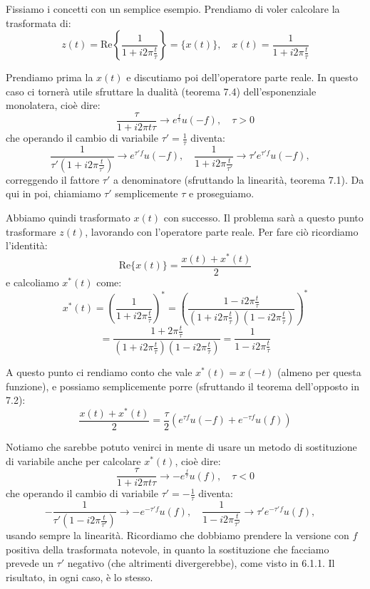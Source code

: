 \documentclass[a4paper,11pt]{article}
\begin{document}
\begin{enumerate}
\begin{enumerate}
Fissiamo i concetti con un semplice esempio. Prendiamo di voler calcolare la trasformata di:
$$
z(t) = \mathrm{Re} \left\{ \frac{1}{1 + i 2 \pi \frac{t}{\tau} } \right\} = \{ x(t) \}, \quad x(t) = \frac{1}{1 + i 2 \pi \frac{t}{\tau}}
$$

Prendiamo prima la $x(t)$ e discutiamo poi dell'operatore parte reale.
In questo caso ci tornerà utile sfruttare la dualità (teorema 7.4) dell'esponenziale monolatera, cioè dire:
$$
\frac{\tau}{1 + i 2 \pi t \tau} \rightarrow e^{\frac{f}{\tau}} u(-f)  , \quad \tau > 0
$$
che operando il cambio di variabile $\tau' = \frac{1}{\tau}$ diventa:
$$
\frac{1}{\tau' \left( 1 + i 2 \pi \frac{t}{\tau'} \right) } \rightarrow e^{\tau' f} u(-f), \quad
\frac{1}{ 1 + i 2 \pi \frac{t}{\tau'} } \rightarrow \tau' e^{\tau' f} u(-f), \quad
$$
correggendo il fattore $\tau'$ a denominatore (sfruttando la linearità, teorema 7.1). Da qui in poi, chiamiamo $\tau'$ semplicemente $\tau$ e proseguiamo.

Abbiamo quindi trasformato $x(t)$ con successo. Il problema sarà a questo punto trasformare $z(t)$, lavorando con l'operatore parte reale. Per fare ciò ricordiamo l'identità:
$$
\mathrm{Re} \{ x(t) \} = \frac{x(t) + x^*(t)}{2}
$$
e calcoliamo $x^*(t)$ come:
$$
x^*(t) = \left( \frac{1}{1 + i 2 \pi \frac{t}{\tau} }\right)^* = \left( \frac{1 - i 2 \pi \frac{t}{\tau} }{ \left( 1 + i 2 \pi \frac{t}{\tau} \right) \left( 1 - i 2 \pi \frac{t}{\tau} \right) } \right)^*
$$
$$
= \frac{1 + 2 \pi \frac{t}{\tau} }{ \left( 1 + i 2 \pi \frac{t}{\tau} \right) \left( 1 - i 2 \pi \frac{t}{\tau} \right) } = \frac{1}{ 1 - i 2 \pi \frac{t}{\tau} }
$$

A questo punto ci rendiamo conto che vale $x^*(t) = x(-t)$ (almeno per questa funzione), e possiamo semplicemente porre (sfruttando il teorema dell'opposto in 7.2):
$$
\frac{x(t) + x^*(t)}{2} = \frac{\tau}{2} \left( e^{\tau f} u(-f) + e^{-\tau f} u(f) \right)
$$

Notiamo che sarebbe potuto venirci in mente di usare un metodo di sostituzione di variabile anche per calcolare $x^*(t)$, cioè dire:
$$
\frac{\tau}{1 + i 2 \pi t \tau} \rightarrow -e^{\frac{f}{\tau}} u(f) , \quad \tau < 0
$$
che operando il cambio di variabile $\tau' = -\frac{1}{\tau}$ diventa:
$$
-\frac{1}{\tau' \left( 1 - i 2 \pi \frac{t}{\tau'} \right) } \rightarrow -e^{-\tau' f} u(f), \quad
\frac{1}{ 1 - i 2 \pi \frac{t}{\tau'} } \rightarrow \tau' e^{-\tau' f} u(f), \quad
$$
usando sempre la linearità. Ricordiamo che dobbiamo prendere la versione con $f$ positiva della trasformata notevole, in quanto la sostituzione che facciamo prevede un $\tau'$ negativo (che altrimenti divergerebbe), come visto in 6.1.1. Il risultato, in ogni caso, è lo stesso.



\end{enumerate}
\end{enumerate}
\end{document}

